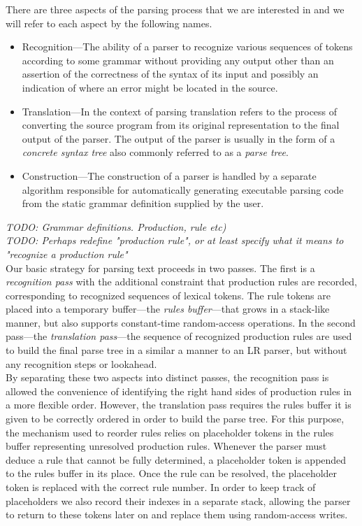 \documentclass[11pt]{article}
\begin{document}
There are three aspects of the parsing process that we are interested in and we will refer to each aspect by the following names.
\begin{itemize}
\item Recognition---The ability of a parser to recognize various sequences of tokens according to some grammar without providing any output other than an assertion of the correctness of the syntax of its input and possibly an indication of where an error might be located in the source.
\item Translation---In the context of parsing translation refers to the process of converting the source program from its original representation to the final output of the parser. The output of the parser is usually in the form of a \emph{concrete syntax tree} also commonly referred to as a \emph{parse tree}.
\item Construction---The construction of a parser is handled by a separate algorithm responsible for automatically generating executable parsing code from the static grammar definition supplied by the user.
\end{itemize}

\emph{TODO: Grammar definitions. Production, rule etc)}\\
\emph{TODO: Perhaps redefine "production rule", or at least specify what it means to "recognize a production rule"}\\

Our basic strategy for parsing text proceeds in two passes.
The first is a \emph{recognition pass} with the additional constraint that production rules are recorded, corresponding to recognized sequences of lexical tokens. The rule tokens are placed into a temporary buffer---the \emph{rules buffer}---that grows in a stack-like manner, but also supports constant-time random-access operations.
In the second pass---the \emph{translation pass}---the sequence of recognized production rules are used to build the final parse tree in a similar a manner to an LR parser, but without any recognition steps or lookahead.\\

By separating these two aspects into distinct passes, the recognition pass is allowed the convenience of identifying the right hand sides of production rules in a more flexible order. 
However, the translation pass requires the rules buffer it is given to be correctly ordered in order to build the parse tree.
For this purpose, the mechanism used to reorder rules relies on placeholder tokens in the rules buffer representing unresolved production rules.
Whenever the parser must deduce a rule that cannot be fully determined, a placeholder token is appended to the rules buffer in its place. 
Once the rule can be resolved, the placeholder token is replaced with the correct rule number. 
In order to keep track of placeholders we also record their indexes in a separate stack, allowing the parser to return to these tokens later on and replace them using random-access writes.
\end{document}
